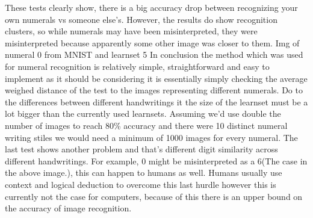 \documentclass{article}
\begin{document}
	These tests clearly show, there is a big accuracy drop between recognizing your own numerals vs someone else’s.
	However, the results do show recognition clusters, so while numerals may have been misinterpreted, they were misinterpreted because apparently some other image was closer to them.
	Img of numeral 0 from MNIST and learnset 5
	In conclusion the method which was used for numeral recognition is relatively simple, straightforward and easy to implement as it should be considering it is essentially simply checking the average weighed distance of the test to the images representing different numerals. Do to the differences between different handwritings it the size of the learnset must be a lot bigger than the currently used learnsets. Assuming we’d use double the number of images to reach 80\% accuracy and there were 10 distinct numeral writing stiles we would need a minimum of 1000 images for every numeral. 
	The last test shows another problem and that’s different digit similarity across different handwritings. For example, 0 might be misinterpreted as a 6(The case in the above image.), this can happen to humans as well. Humans usually use context and logical deduction to overcome this last hurdle however this is currently not the case for computers, because of this there is an upper bound on the accuracy of image recognition. 

 

\end{document}
